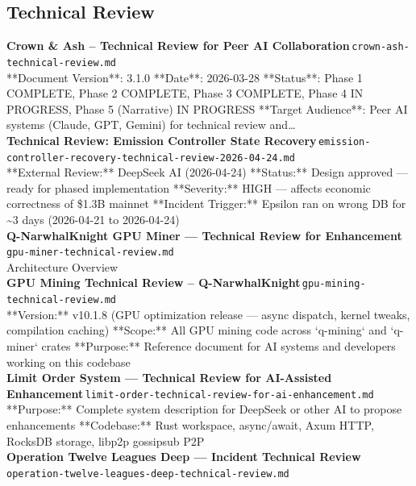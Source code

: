 \documentclass[11pt,a4paper]{article}
\begin{document}
\subsection*{Technical Review}
\noindent\textbf{Crown \& Ash -- Technical Review for Peer AI Collaboration}\,\textcolor{qgray}{\small \texttt{crown-ash-technical-review.md}}\\
**Document Version**: 3.1.0 **Date**: 2026-03-28 **Status**: Phase 1 COMPLETE, Phase 2 COMPLETE, Phase 3 COMPLETE, Phase 4 IN PROGRESS, Phase 5 (Narrative) IN PROGRESS **Target Audience**: Peer AI systems (Claude, GPT, Gemini) for technical review and\ldots{}\\[6pt]
\noindent\textbf{Technical Review: Emission Controller State Recovery}\,\textcolor{qgray}{\small \texttt{emission-controller-recovery-technical-review-2026-04-24.md}}\\
**External Review:** DeepSeek AI (2026-04-24) **Status:** Design approved --- ready for phased implementation **Severity:** HIGH --- affects economic correctness of \$1.3B mainnet **Incident Trigger:** Epsilon ran on wrong DB for \textasciitilde{}3 days (2026-04-21 to 2026-04-24)\\[6pt]
\noindent\textbf{Q-NarwhalKnight GPU Miner --- Technical Review for Enhancement}\,\textcolor{qgray}{\small \texttt{gpu-miner-technical-review.md}}\\
Architecture Overview\\[6pt]
\noindent\textbf{GPU Mining Technical Review -- Q-NarwhalKnight}\,\textcolor{qgray}{\small \texttt{gpu-mining-technical-review.md}}\\
**Version:** v10.1.8 (GPU optimization release --- async dispatch, kernel tweaks, compilation caching) **Scope:** All GPU mining code across `q-mining` and `q-miner` crates **Purpose:** Reference document for AI systems and developers working on this codebase\\[6pt]
\noindent\textbf{Limit Order System --- Technical Review for AI-Assisted Enhancement}\,\textcolor{qgray}{\small \texttt{limit-order-technical-review-for-ai-enhancement.md}}\\
**Purpose:** Complete system description for DeepSeek or other AI to propose enhancements **Codebase:** Rust workspace, async/await, Axum HTTP, RocksDB storage, libp2p gossipsub P2P\\[6pt]
\noindent\textbf{Operation Twelve Leagues Deep --- Incident Technical Review}\,\textcolor{qgray}{\small \texttt{operation-twelve-leagues-deep-technical-review.md}}\\
\end{document}
